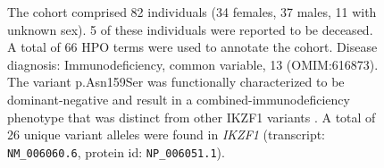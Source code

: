 \begin{figure}[htbp]
\vspace{2em}

\caption{ The cohort comprised 82 individuals (34 females, 37 males, 11 with unknown sex). 5 of these individuals were reported to be deceased. 
A total of 66 HPO terms were used to annotate the cohort. Disease diagnosis: Immunodeficiency, common variable, 13 (OMIM:616873). 
The variant p.Asn159Ser was functionally characterized to be dominant-negative and result in a combined-immunodeficiency phenotype that 
was distinct from other IKZF1 variants \cite{PMID_29889099}. A total of 26 unique variant alleles were found in \textit{IKZF1} (transcript: \texttt{NM\_006060.6}, protein id: \texttt{NP\_006051.1}).}
\end{figure}
